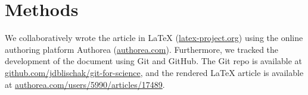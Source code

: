 \section*{Methods}

We collaboratively wrote the article in LaTeX (\href{http://www.latex-project.org/}{latex-project.org}) using the online authoring platform Authorea (\href{https://www.authorea.com}{authorea.com}).
Furthermore, we tracked the development of the document using Git and GitHub.
The Git repo is available at \href{https://github.com/jdblischak/git-for-science}{github.com/jdblischak/git-for-science}, and the rendered LaTeX article is available at \href{https://www.authorea.com/users/5990/articles/17489}{authorea.com/users/5990/articles/17489}.
